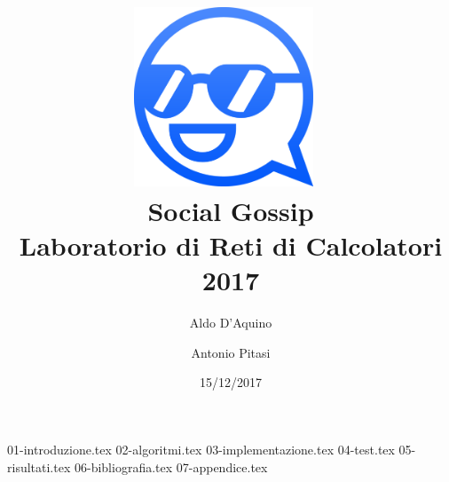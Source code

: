 \documentclass{article}
\title{%
\includegraphics[width=0.4\textwidth]{logo.png}~ 
\\[3cm]
\Huge Social Gossip \\
\large Laboratorio di Reti di Calcolatori 2017}
\author{Aldo D'Aquino \and Antonio Pitasi}
\date{15/12/2017}
\begin{document}
\maketitle

\newpage

{01-introduzione.tex}
{02-algoritmi.tex}
{03-implementazione.tex}
{04-test.tex}
{05-risultati.tex}
{06-bibliografia.tex}
{07-appendice.tex}
\end{document}

